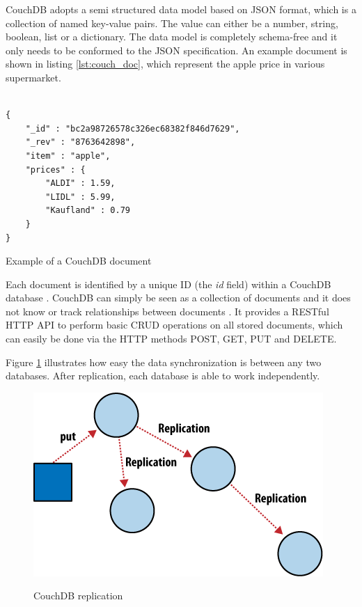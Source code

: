 CouchDB adopts a semi structured data model based on \ac{JSON} format, which is a collection of named key-value pairs. The value can either be a number, string, boolean, list or a dictionary. The data model is completely schema-free and it only needs to be conformed to the \ac{JSON} specification. An example document is shown in listing \ref{lst:couch_doc}, which represent the apple price in various supermarket. 
\\
\\
\begin{code}
\begin{verbatim}
{
    "_id" : "bc2a98726578c326ec68382f846d7629",
    "_rev" : "8763642898",
    "item" : "apple",
    "prices" : {
        "ALDI" : 1.59,
        "LIDL" : 5.99,
        "Kaufland" : 0.79
    }
}
\end{verbatim}
\caption{Example of a CouchDB document}
\label{lst:couch_doc}
\end{code}

Each document is identified by a unique ID (the \textit{id} field) within a CouchDB database . CouchDB can simply be seen as a collection of documents and it does not know or track relationships between documents \cite{books/daglib/0024051}.  It provides a RESTful \ac{HTTP} \ac{API} to perform basic CRUD operations on all stored documents, which can easily be done via the \ac{HTTP} methods POST, GET, PUT and DELETE.

Figure \ref{fig:couchdb_repl} illustrates how easy the data synchronization is between any two databases. After replication, each database is able to work independently.

\begin{figure}[htb]
  \centering
  \includegraphics{couchdb_repl.png}\\
  \caption{CouchDB replication}
  \label{fig:couchdb_repl}
  \protect\cite{couchdb_cons}
\end{figure}

